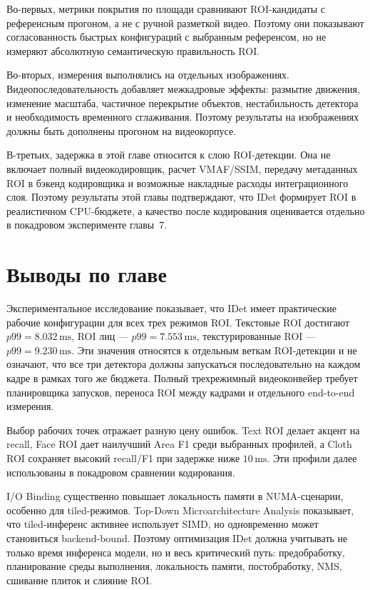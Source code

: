 \documentclass[12pt,a4paper,oneside,openany]{report}
\newcommand{\ms}{\mathrm{ms}}
\begin{document}
Во-первых, метрики покрытия по площади сравнивают ROI-кандидаты с референсным прогоном, а не с
ручной разметкой видео. Поэтому они показывают согласованность быстрых конфигураций с выбранным
референсом, но не измеряют абсолютную семантическую правильность ROI.

Во-вторых, измерения выполнялись на отдельных изображениях. Видеопоследовательность добавляет
межкадровые эффекты: размытие движения, изменение масштаба, частичное перекрытие объектов,
нестабильность детектора и необходимость временного сглаживания. Поэтому результаты на
изображениях должны быть дополнены прогоном на видеокорпусе.

В-третьих, задержка в этой главе относится к слою ROI-детекции. Она не включает полный
видеокодировщик, расчет VMAF/SSIM, передачу метаданных ROI в бэкенд кодировщика и возможные
накладные расходы интеграционного слоя. Поэтому результаты этой главы подтверждают, что IDet
формирует ROI в реалистичном CPU-бюджете, а качество после кодирования оценивается отдельно в
покадровом эксперименте главы~7.


\section{Выводы по главе}

Экспериментальное исследование показывает, что IDet имеет практические рабочие конфигурации для
всех трех режимов ROI. Текстовые ROI достигают $p99=8.032\,\ms$, ROI лиц --- $p99=7.553\,\ms$,
текстурированные ROI --- $p99=9.230\,\ms$. Эти значения относятся к отдельным веткам ROI-детекции
и не означают, что все три детектора должны запускаться последовательно на каждом кадре в рамках
того же бюджета. Полный трехрежимный видеоконвейер требует планировщика запусков, переноса ROI
между кадрами и отдельного end-to-end измерения.

Выбор рабочих точек отражает разную цену ошибок. Text ROI делает акцент на recall, Face ROI
дает наилучший Area F1 среди выбранных профилей, а Cloth ROI сохраняет высокий recall/F1 при
задержке ниже $10\,\ms$. Эти профили далее использованы в покадровом сравнении кодирования.

I/O Binding существенно повышает локальность памяти в NUMA-сценарии, особенно для tiled-режимов.
Top-Down Microarchitecture Analysis показывает, что tiled-инференс активнее использует SIMD, но
одновременно может становиться backend-bound. Поэтому оптимизация IDet должна учитывать не
только время инференса модели, но и весь критический путь: предобработку, планирование среды
выполнения, локальность памяти, постобработку, NMS, сшивание плиток и слияние ROI.
\end{document}
